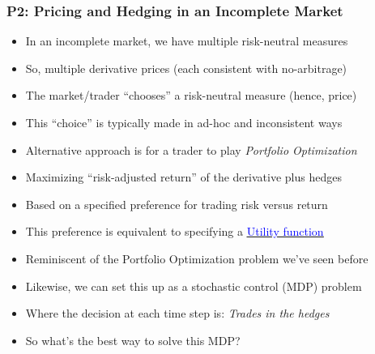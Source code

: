 \documentclass[handout]{beamer}
\begin{document}
\begin{frame}
\frametitle{P2: Pricing and Hedging in an Incomplete Market}
\pause
\begin{itemize}[<+->]
\item In an incomplete market, we have multiple risk-neutral measures
\item So, multiple derivative prices (each consistent with no-arbitrage)
\item The market/trader ``chooses'' a risk-neutral measure (hence, price)
\item This ``choice'' is typically made in ad-hoc and inconsistent ways
\item Alternative approach is for a trader to play {\em Portfolio Optimization}
\item Maximizing ``risk-adjusted return'' of the derivative plus hedges
\item Based on a specified preference for trading risk versus return
\item This preference is equivalent to specifying a \href{https://github.com/coverdrive/technical-documents/blob/master/finance/cme241/UtilityTheoryForRisk.pdf}{\underline{\textcolor{blue}{Utility function}}}
\item Reminiscent of the Portfolio Optimization problem we've seen before
\item Likewise, we can set this up as a stochastic control (MDP) problem
\item Where the decision at each time step is: {\em Trades in the hedges}
\item So what's the best way to solve this MDP?
\end{itemize}
\end{frame}
\end{document}
